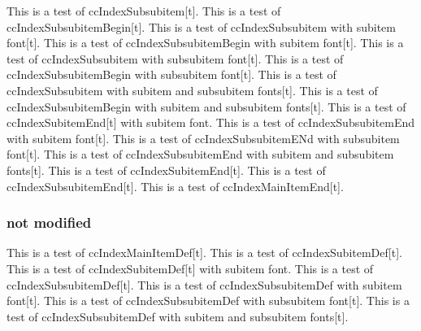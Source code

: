 \documentclass{article}
\begin{document}
{{{{This is a test of ccIndexSubsubitem[t].
This is a test of ccIndexSubsubitemBegin[t].
This is a test of ccIndexSubsubitem with subitem font[t].
This is a test of ccIndexSubsubitemBegin with subitem font[t].
This is a test of ccIndexSubsubitem with subsubitem font[t].
This is a test of ccIndexSubsubitemBegin with subsubitem font[t].
This is a test of ccIndexSubsubitem with subitem and subsubitem fonts[t].
This is a test of ccIndexSubsubitemBegin with subitem and subsubitem fonts[t].
\pagebreak
This is a test of ccIndexSubitemEnd[t] with subitem font.
This is a test of ccIndexSubsubitemEnd with subitem font[t].
This is a test of ccIndexSubsubitemENd with subsubitem font[t].
This is a test of ccIndexSubsubitemEnd with subitem and subsubitem fonts[t].
This is a test of ccIndexSubitemEnd[t].
This is a test of ccIndexSubsubitemEnd[t].
This is a test of ccIndexMainItemEnd[t].

\subsubsection{not modified}
This is a test of ccIndexMainItemDef[t].
This is a test of ccIndexSubitemDef[t].
This is a test of ccIndexSubitemDef[t] with subitem font.
This is a test of ccIndexSubsubitemDef[t].
This is a test of ccIndexSubsubitemDef with subitem font[t].
This is a test of ccIndexSubsubitemDef with subsubitem font[t].
This is a test of ccIndexSubsubitemDef with subitem and subsubitem fonts[t].

}}}}
\end{document}
